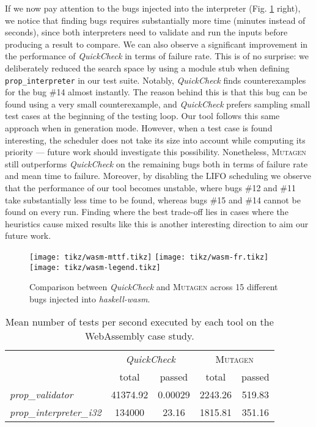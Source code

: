 \documentclass[sigconf,review,anonymous]{acmart}
\newcommand{\quickcheck}{\textit{QuickCheck}\xspace}
\newcommand{\mutagen}{\textsc{Mutagen}\xspace}
\begin{document}
If we now pay attention to the bugs injected into the interpreter (Fig.
\ref{fig:results:wasm} right), we notice that finding bugs requires
substantially more time (minutes instead of seconds), since both interpreters
need to validate and run the inputs before producing a result to compare.
%
We can also observe a significant improvement in the performance of \quickcheck
in terms of failure rate.
%
This is of no surprise: we deliberately reduced the search space by using a
module stub when defining \texttt{prop\_interpreter} in our test suite.
%
Notably, \quickcheck finds counterexamples for the bug \#14 almost instantly.
%
The reason behind this is that this bug can be found using a very small
counterexample, and \quickcheck prefers sampling small test cases at the
beginning of the testing loop.
%
Our tool follows this same approach when in generation mode.
%
However, when a test case is found interesting, the scheduler does not take its
size into account while computing its priority --- future work should
investigate this possibility.
%
Nonetheless, \mutagen still outperforms \quickcheck on the remaining bugs both
in terms of failure rate and mean time to failure.
%
Moreover, by disabling the LIFO scheduling we observe that the performance of
our tool becomes unstable, where bugs \#12 and \#11 take substantially less time
to be found, whereas bugs \#15 and \#14 cannot be found on every run.
%
Finding where the best trade-off lies in cases where the heuristics cause mixed
results like this is another interesting direction to aim our future work.

\begin{figure}[t]
  \centering
  \texttt{[image: tikz/wasm-mttf.tikz]}
  \texttt{[image: tikz/wasm-fr.tikz]}\vspace{-5pt}
  \texttt{[image: tikz/wasm-legend.tikz]}
  \vspace{-20pt}
  \caption{\label{fig:results:wasm} Comparison between \quickcheck and \mutagen
    across 15 different bugs injected into \textit{haskell-wasm}. }
\end{figure}

\begin{table}[t]
\footnotesize
\begin{tabular}{|l|c|c|c|c|}
\hline
\multicolumn{1}{|c|}{
  \multirow{2}{*}{Property}}
  & \multicolumn{2}{c|}{\quickcheck}
  & \multicolumn{2}{c|}{\mutagen} \\
  \cline{2-5}
  \multicolumn{1}{|c|}{}
  & \multicolumn{1}{c|}{total}
  & passed
  & \multicolumn{1}{c|}{total}
  & passed \\
\hline
\textit{prop\_validator}
& 41374.92
& 0.00029
& 2243.26
& 519.83\\
\hline
\textit{prop\_interpreter\_i32}
& 134000
& 23.16
& 1815.81
& 351.16 \\
\hline
\end{tabular}
\caption{\label{table:wasm:overhead}Mean number of tests per second executed by
  each tool on the WebAssembly case study.}
\vspace{-10pt}
\end{table}
\end{document}
